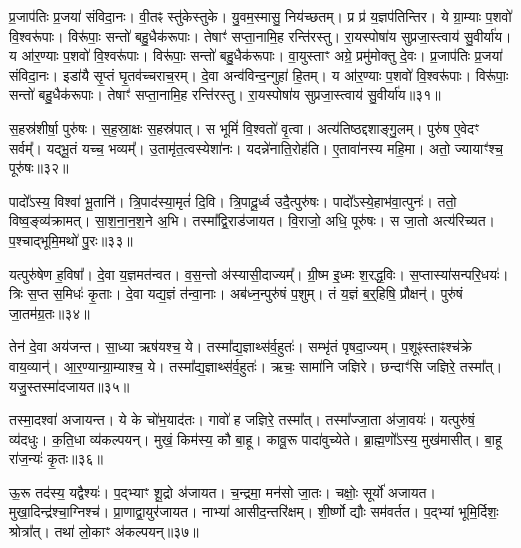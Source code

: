 प्र॒जाप॑तिः प्र॒जया॑ संविदा॒नः। 
वी॒तꣴ स्तु॑केस्तुके। 
यु॒वम॒स्मासु॒ निय॑च्छतम्। 
प्र प्र॑ य॒ज्ञप॑तिन्तिर। 
ये ग्रा॒म्याः प॒शवो॑ वि॒श्वरू॑पाः। 
विरू॑पाः॒ सन्तो॑ बहु॒धैक॑रूपाः। 
तेषाꣳ॑ सप्ता॒नामि॒ह रन्ति॑रस्तु। 
रा॒यस्पोषा॑य सुप्रजा॒स्त्वाय॑ सु॒वीर्या॑य। 
य आ॑र॒ण्याः प॒शवो॑ वि॒श्वरू॑पाः। 
विरू॑पाः॒ सन्तो॑ बहु॒धैक॑रूपाः। 
वा॒युस्ताꣳ अग्रे॒ प्रमु॑मोक्तु दे॒वः। 
प्र॒जाप॑तिः प्र॒जया॑ संविदा॒नः। 
इडा॑यै सृ॒प्तं घृ॒तव॑च्चराच॒रम्। 
दे॒वा अन्व॑विन्द॒न्गुहा॑ हि॒तम्। 
य आ॑र॒ण्याः प॒शवो॑ वि॒श्वरू॑पाः। 
विरू॑पाः॒ सन्तो॑ बहु॒धैक॑रूपाः। 
तेषाꣳ॑ सप्ता॒नामि॒ह रन्ति॑रस्तु। 
रा॒यस्पोषा॑य सुप्रजा॒स्त्वाय॑ सु॒वीर्या॑य॥३१॥\ip
\anuvakamend[आ॒त्मा जना॑नां  विकु॒र्वन्तं॑  विप॒श्चिं प्र॒जानां᳚ वसु॒धानीं᳚  वि॒राजं॒ चर॑न्तं॒  गोम॑तीं मे॒ निय॑च्छ॒त्वेक॑चक्रं॒ व्यो॑मन्मा॒यया॑ दे॒व एक॑रूपा अ॒ष्टौ च॑]

स॒हस्र॑शीर्\mbox{}षा॒ पुरु॑षः। 
स॒ह॒स्रा॒क्षः स॒हस्र॑पात्। 
स भूमिं॑ वि॒श्वतो॑ वृ॒त्वा। 
अत्य॑तिष्ठद्दशाङ्गु॒लम्। 
पुरु॑ष ए॒वेदꣳ सर्वम्᳚। 
यद्भू॒तं यच्च॒ भव्यम्᳚। 
उ॒तामृ॑त॒त्वस्येशा॑नः। 
यदन्ने॑नाति॒रोह॑ति। 
ए॒तावा॑नस्य महि॒मा। 
अतो॒ ज्यायाꣳ॑श्च॒ पूरु॑षः॥३२॥\ip

पादो᳚ऽस्य॒ विश्वा॑ भू॒तानि॑। 
त्रि॒पाद॑स्या॒मृतं॑ दि॒वि। 
त्रि॒पादू॒र्ध्व उदै॒त्पुरु॑षः। 
पादो᳚ऽस्ये॒हाभ॑वा॒त्पुनः॑। 
ततो॒ विष्व॒ङ्व्य॑क्रामत्। 
सा॒श॒ना॒न॒श॒ने अ॒भि। 
तस्मा᳚द्वि॒राड॑जायत। 
वि॒राजो॒ अधि॒ पूरु॑षः। 
स जा॒तो अत्य॑रिच्यत। 
प॒श्चाद्भूमि॒मथो॑ पु॒रः॥३३॥\ip

यत्पुरु॑षेण ह॒विषा᳚। 
दे॒वा य॒ज्ञमत॑न्वत। 
व॒स॒न्तो अ॑स्यासी॒\-दाज्यम्᳚। 
ग्री॒ष्म इ॒ध्मः  श॒रद्ध॒विः। 
स॒प्तास्या॑सन्परि॒\-धयः॑। 
त्रिः स॒प्त स॒मिधः॑ कृ॒ताः। 
दे॒वा यद्य॒ज्ञं त॑न्वा॒नाः। 
अब॑ध्न॒न्पुरु॑षं प॒शुम्। 
तं य॒ज्ञं ब॒र्॒‌हिषि॒ प्रौक्षन्॑। 
पुरु॑षं जा॒तम॑ग्र॒तः॥३४॥\ip

तेन॑ दे॒वा अय॑जन्त। 
सा॒ध्या ऋष॑यश्च॒ ये। 
तस्मा᳚द्य॒ज्ञाथ्स॑र्व॒हुतः॑। 
सम्भृ॑तं पृषदा॒ज्यम्। 
प॒शूꣴस्ताꣴश्च॑क्रे वाय॒व्यान्॑। 
आ॒र॒ण्यान्ग्रा॒म्याश्च॒ ये। 
तस्मा᳚द्य॒ज्ञाथ्स॑र्व॒हुतः॑। 
ऋचः॒ सामा॑नि जज्ञिरे। 
छन्दाꣳ॑सि जज्ञिरे॒ तस्मा᳚त्। 
यजु॒स्तस्मा॑दजायत॥३५॥\ip

तस्मा॒दश्वा॑ अजायन्त। 
ये के चो॑भ॒याद॑तः। 
गावो॑ ह जज्ञिरे॒ तस्मा᳚त्। 
तस्मा᳚ज्जा॒ता अ॑जा॒वयः॑। 
यत्पुरु॑षं॒ व्य॑दधुः। 
क॒ति॒धा व्य॑कल्पयन्। 
मुखं॒ किम॑स्य॒ कौ बा॒हू। 
कावू॒रू पादा॑वुच्येते। 
ब्रा॒ह्म॒णो᳚ऽस्य॒ मुख॑मासीत्। 
बा॒हू रा॑ज॒न्यः॑ कृ॒तः॥३६॥\ip

ऊ॒रू तद॑स्य॒ यद्वैश्यः॑। 
प॒द्भ्याꣳ शू॒द्रो अ॑जायत। 
च॒न्द्रमा॒ मन॑सो जा॒तः। 
चक्षोः॒ सूर्यो॑ अजायत। 
मुखा॒दिन्द्र॑श्चा॒ग्निश्च॑। 
प्रा॒णाद्वा॒युर॑जायत। 
नाभ्या॑ आसीद॒न्तरि॑क्षम्। 
शी॒र्ष्णो द्यौः सम॑वर्तत। 
प॒द्भ्यां भूमि॒र्दिशः॒ श्रोत्रा᳚त्। 
तथा॑ लो॒काꣳ अ॑कल्पयन्॥३७॥\ip

